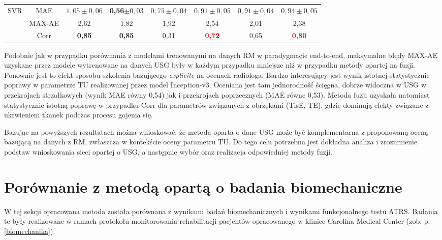 \begin{table}[h]
\begin{tabular}{lc||c|c|c|c|c|c}
		SVR & MAE & $1,05\pm0,06$ & \textbf{0,56}$\pm0,03$ & $0,75\pm0,04$ & $0,91\pm0,05$ & $0,91\pm0,04$ & $0,94\pm0,05$\\
		& MAX-AE & 2,62 & 1,82 & 1,92 & 2,54 & 2,01 & 2,38 \\
		& Corr   & \textbf{0,85} & \textbf{0,85} & 0,31 & \textcolor{red}{\textbf{0,72}} & 0,65 & \textcolor{red}{\textbf{0,80}} \\
		 
	\end{tabular}
\end{table}
\renewcommand{\arraystretch}{1}

Podobnie jak w przypadku porównania z modelami trenowanymi na danych RM w paradygmacie end-to-end, maksymalne błędy MAX-AE uzyskane przez modele wytrenowane na danych USG były w każdym przypadku mniejsze niż w przypadku metody opartej na fuzji. Ponownie jest to efekt sposobu szkolenia bazującego \textit{explicite} na ocenach radiologa. Bardzo interesujący jest wynik istotnej statystycznie poprawy w parametrze TU realizowanej przez model Inception-v3. Oceniana jest tam jednorodność ścięgna, dobrze widoczna w USG w przekrojach strzałkowych (wynik MAE równy 0,54) jak i przekrojach poprzecznych (MAE równe 0,53). Metoda fuzji uzyskała natomiast statystycznie istotną poprawę w przypadku Corr dla parametrów związanych z obrzękami (TisE, TE), gdzie dominują efekty związane \linebreak z ukrwieniem tkanek podczas procesu gojenia się.

Bazując na powyższych rezultatach można wnioskować, że metoda oparta \linebreak o dane USG może być komplementarna z proponowaną oceną bazującą na danych \linebreak z RM, zwłaszcza w kontekście oceny parametru TU. Do tego celu potrzebna jest dokładna analiza i zrozumienie podstaw wnioskowania sieci opartej o USG, a następnie wybór oraz realizacja odpowiedniej metody fuzji.

\section{Porównanie z metodą opartą o badania biomechaniczne}
\label{seq:comp-biomechanics}
W tej sekcji opracowana metoda została porównana z wynikami badań biomechanicznych i wynikami funkcjonalnego testu ATRS. Badania te były realizowane w ramach protokołu monitorowania rehabilitacji pacjentów opracowanego w klinice Carolina Medical Center (zob. p. \ref{biomechanika}). 

